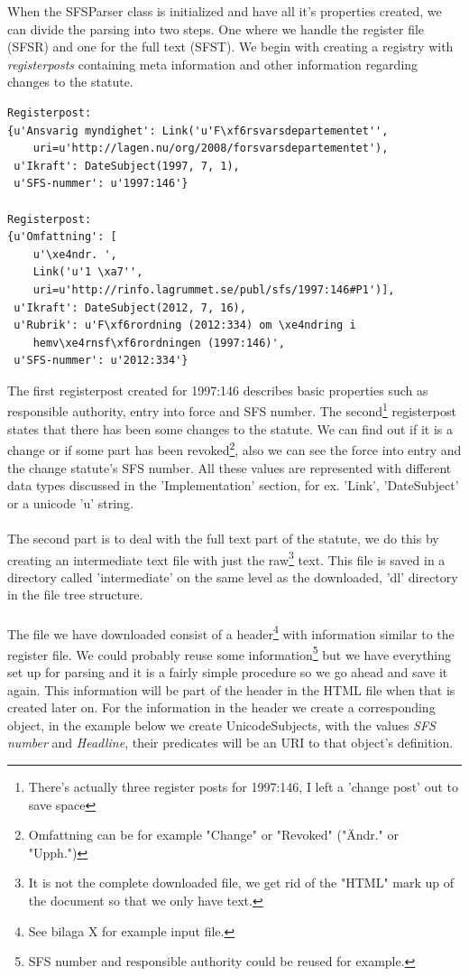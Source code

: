 When the SFSParser class is initialized and have all it’s properties created, we can divide the parsing into two steps. One where we handle the register file (SFSR) and one for the full text (SFST). We begin with creating a registry with \textit{registerposts} containing meta information and other information regarding changes to the statute.\\ 
\begin{verbatim}
Registerpost: 
{u'Ansvarig myndighet': Link('u'F\xf6rsvarsdepartementet'',
	uri=u'http://lagen.nu/org/2008/forsvarsdepartementet'), 
 u'Ikraft': DateSubject(1997, 7, 1), 
 u'SFS-nummer': u'1997:146'}

Registerpost: 
{u'Omfattning': [
	u'\xe4ndr. ', 
	Link('u'1 \xa7'',
	uri=u'http://rinfo.lagrummet.se/publ/sfs/1997:146#P1')],
 u'Ikraft': DateSubject(2012, 7, 16), 
 u'Rubrik': u'F\xf6rordning (2012:334) om \xe4ndring i 
	hemv\xe4rnsf\xf6rordningen (1997:146)', 
 u'SFS-nummer': u'2012:334'}
\end{verbatim}
\linebreak
\newline
The first registerpost created for 1997:146 describes basic properties such as responsible authority, entry into force and SFS number. The second\footnote{There's actually three register posts for 1997:146, I left a 'change post' out to save space} registerpost states that there has been some changes to the statute. We can find out if it is a change or if some part has been revoked\footnote{Omfattning can be for example "Change" or "Revoked" ("Ändr." or "Upph.")}, also we can see the force into entry and the change statute's SFS number. All these values are represented with different data types discussed in the 'Implementation' section, for ex. 'Link', 'DateSubject' or a unicode 'u' string.\\\\
The second part is to deal with the full text part of the statute, we do this by creating an intermediate text file with just the raw\footnote{It is not the complete downloaded file, we get rid of the "HTML" mark up of the document so that we only have text.} text. This file is saved in a directory called 'intermediate' on the same level as the downloaded, 'dl' directory in the file tree structure. \\\\ 
The file we have downloaded consist of a header\footnote{See bilaga X for example input file.} with information similar to the register file. We could probably reuse some information\footnote{SFS number and responsible authority could be reused for example.} but we have everything set up for parsing and it is a fairly simple procedure so we go ahead and save it again. This information will be part of the header in the HTML file when that is created later on. For the information in the header we create a corresponding object, in the example below we create UnicodeSubjects, with the values \textit{SFS number} and \textit{Headline}, their predicates will be an URI to that object's definition.\\
